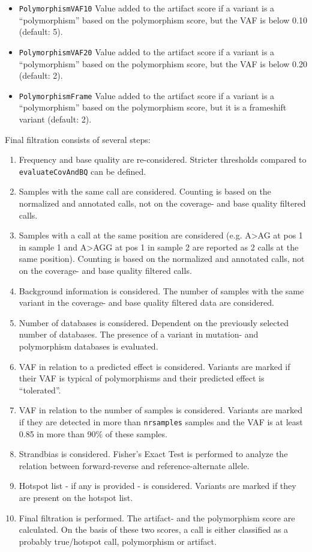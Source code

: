 \documentclass{article}
\begin{document}
\begin{itemize}
  \item \texttt{PolymorphismVAF10} Value added to the artifact score if a variant is a ``polymorphism'' based on the polymorphism score, but the VAF is below 0.10 (default: 5).
  \item \texttt{PolymorphismVAF20} Value added to the artifact score if a variant is a ``polymorphism'' based on the polymorphism score, but the VAF is below 0.20 (default: 2).
  \item \texttt{PolymorphismFrame} Value added to the artifact score if a variant is a ``polymorphism'' based on the polymorphism score, but it is a frameshift variant (default: 2).
\end{itemize}

Final filtration consists of several steps:

\begin{enumerate}
\item Frequency and base quality are re-considered. Stricter thresholds compared to \texttt{evaluateCovAndBQ} can be defined.
\item Samples with the same call are considered. Counting is based on the normalized and annotated calls, not on the coverage- and base quality filtered calls.
\item Samples with a call at the same position are considered (e.g. A>AG at pos 1 in sample 1 and A>AGG at pos 1 in sample 2 are reported as 2 calls at the same position). Counting is based on the normalized and annotated calls, not on the coverage- and base quality filtered calls.
\item Background information is considered. The number of samples with the same variant in the coverage- and base quality filtered data are considered.
\item Number of databases is considered. Dependent on the previously selected number of databases. The presence of a variant in mutation- and polymorphism databases is evaluated.
\item VAF in relation to a predicted effect is considered. Variants are marked if their VAF is typical of polymorphisms and their predicted effect is ``tolerated''.
\item VAF in relation to the number of samples is considered. Variants are marked if they are detected in more than \texttt{nrsamples} samples and the VAF is at least 0.85 in more than 90\% of these samples.
\item Strandbias is considered. Fisher's Exact Test is performed to analyze the relation between forward-reverse and reference-alternate allele.
\item Hotspot list - if any is provided - is considered. Variants are marked if they are present on the hotspot list.
\item Final filtration is performed. The artifact- and the polymorphism score are calculated. On the basis of these two scores, a call is either classified as a probably true/hotspot call, polymorphism or artifact.
\end{enumerate}
\end{document}
